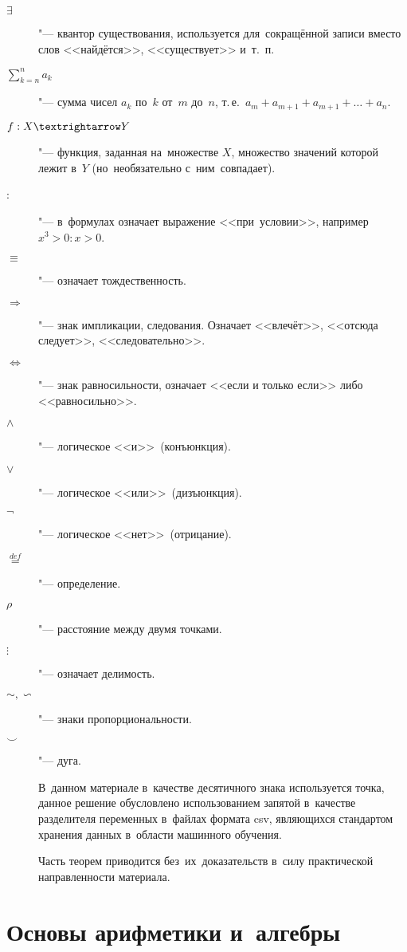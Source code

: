 \documentclass[]{scrartcl}
\begin{document}
\begin{description}
	\item[$\exists$] "--- квантор существования, используется для~сокращённой записи вместо слов <<найдётся>>, <<существует>> и~т.~п.
	\item[$\sum \limits_{k=n}^{n} a_k$] "--- сумма чисел $a_k$ по~$k$ от~$m$ до~$n$, т.\,е.~$a_m + a_{m+1}+a_{m+1}+\ldots+a_n$.
	\item[$f:X \textrightarrow Y$] "--- функция, заданная на~множестве $X$, множество значений которой лежит в~$Y$ (но~необязательно с~ним~совпадает).	
	\item[:] "--- в~формулах означает выражение <<при~условии>>, например $x^3>0:x>0$.
	\item[$\equiv$] "--- означает тождественность.
	\item[$\Rightarrow$] "--- знак импликации, следования. Означает <<влечёт>>, <<отсюда следует>>, <<следовательно>>.
	\item[$\Leftrightarrow$] "--- знак равносильности, означает <<если и только если>> либо <<равносильно>>.
	\item[$\wedge$] "--- логическое <<и>>~(конъюнкция).
	\item[$\vee$] "--- логическое <<или>>~(дизъюнкция).
	\item[$\neg$] "--- логическое <<нет>>~(отрицание).
	\item[$\stackrel{def}{=}$] "--- определение.
	\item[$\rho$] "--- расстояние между двумя точками.
	\item[$\vdots$] "--- означает делимость.
	\item[$\sim, \backsim$] "--- знаки пропорциональности.
	\item[$\smile$] "--- дуга.

В~данном материале в~качестве десятичного знака используется точка, данное решение обусловлено использованием запятой в~качестве разделителя переменных в~файлах формата csv, являющихся стандартом хранения данных в~области машинного обучения.

Часть теорем приводится без~их~доказательств в~силу практической направленности материала.	
	
\end{description}

\section{Основы арифметики и~алгебры}
\end{document}
